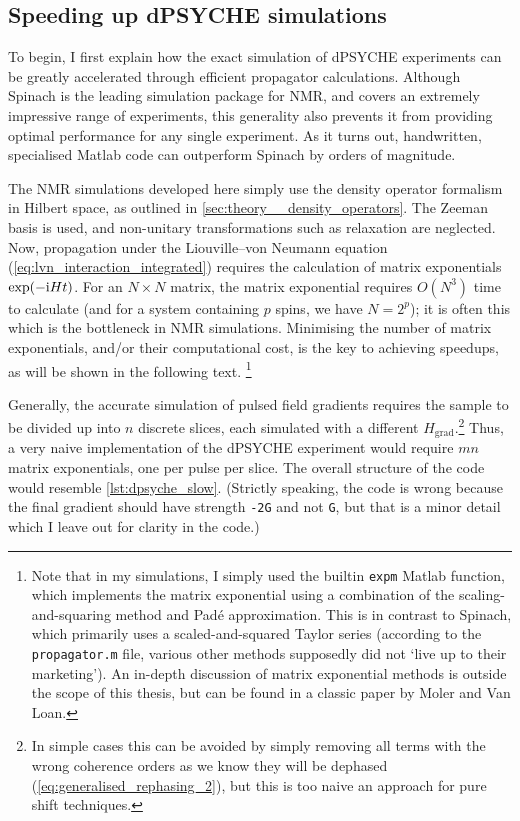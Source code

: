 \subsection{Speeding up dPSYCHE simulations}
\label{subsec:pureshift__dpsyche_simulations}

To begin, I first explain how the exact simulation of dPSYCHE experiments can be greatly accelerated through efficient propagator calculations.
Although Spinach\autocite{Hogben2011JMR} is the leading simulation package for NMR, and covers an extremely impressive range of experiments, this generality also prevents it from providing optimal performance for any single experiment.
As it turns out, handwritten, specialised Matlab code can outperform Spinach by orders of magnitude.

The NMR simulations developed here simply use the density operator formalism in Hilbert space, as outlined in \cref{sec:theory__density_operators}.
The Zeeman basis is used, and non-unitary transformations such as relaxation are neglected.
Now, propagation under the Liouville--von Neumann equation (\cref{eq:lvn_interaction_integrated}) requires the calculation of matrix exponentials $\exp(-\mathrm{i} H t)$.
For an $N \times N$ matrix, the matrix exponential requires $O(N^3)$ time to calculate (and for a system containing $p$ spins, we have $N = 2^p$); it is often this which is the bottleneck in NMR simulations.
Minimising the number of matrix exponentials, and/or their computational cost, is the key to achieving speedups, as will be shown in the following text.%
\footnote{Note that in my simulations, I simply used the builtin \texttt{expm} Matlab function, which implements the matrix exponential using a combination of the scaling-and-squaring method and Pad\'e approximation\autocite{Higham2005SIAMJMAA}.
This is in contrast to Spinach, which primarily uses a scaled-and-squared Taylor series (according to the \texttt{propagator.m} file, various other methods supposedly did not `live up to their marketing').
An in-depth discussion of matrix exponential methods is outside the scope of this thesis, but can be found in a classic paper by Moler and Van Loan\autocite{Moler2003SIAMR}.}

Generally, the accurate simulation of pulsed field gradients requires the sample to be divided up into $n$ discrete slices, each simulated with a different $H_\text{grad}$.\footnote{In simple cases this can be avoided by simply removing all terms with the wrong coherence orders as we know they will be dephased (\cref{eq:generalised_rephasing_2}), but this is too naive an approach for pure shift techniques.}
Thus, a very naive implementation of the dPSYCHE experiment would require $mn$ matrix exponentials, one per pulse per slice.
The overall structure of the code would resemble \cref{lst:dpsyche_slow}.
(Strictly speaking, the code is wrong because the final gradient should have strength \texttt{-2G} and not \texttt{G}, but that is a minor detail which I leave out for clarity in the code.)

